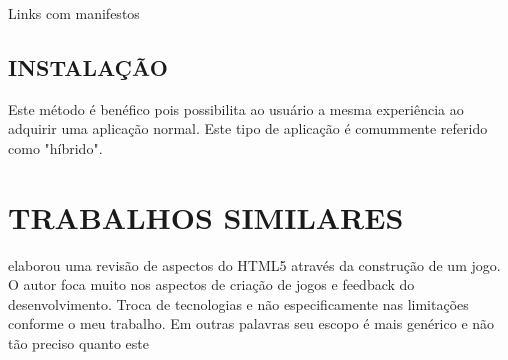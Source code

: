 Links com manifestos

\subsection{INSTALAÇÃO}
Este método é benéfico pois possibilita ao usuário a mesma
experiência ao adquirir uma aplicação normal. Este tipo de
aplicação é comummente referido como "híbrido".

\section{TRABALHOS SIMILARES}
\cite{crossPlatformMobileGame} elaborou uma revisão de aspectos do
HTML5 através da construção de um jogo. O autor foca muito nos
aspectos de criação de jogos e feedback do desenvolvimento. Troca
de tecnologias e não especificamente nas limitações conforme o meu
trabalho. Em outras palavras seu escopo é mais genérico e não tão
preciso quanto este
